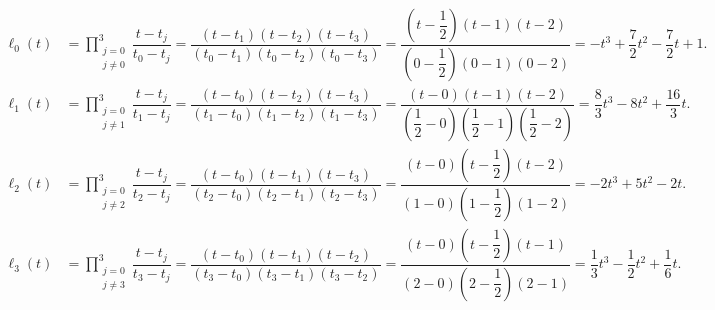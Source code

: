 \begin{frame}
\begin{solution}
		\begin{align*}
			\ell_{0}\left(t\right) & =
			\prod\limits_{\substack{j=0               \\j\neq 0}}^{3}
			\dfrac{t-t_{j}}{t_{0}-t_{j}}=
			\dfrac{
				\left(t-t_{1}\right)
				\left(t-t_{2}\right)
				\left(t-t_{3}\right)
			}{
				\left(t_{0}-t_{1}\right)
				\left(t_{0}-t_{2}\right)
				\left(t_{0}-t_{3}\right)
			}=
			\dfrac{
				\left(t-\dfrac{1}{2}\right)
				\left(t-1\right)\left(t-2\right)
			}{
				\left(0-\dfrac{1}{2}\right)
				\left(0-1\right)
				\left(0-2\right)
			}=
			-t^{3}+\dfrac{7}{2}t^{2}-\dfrac{7}{2}t+1. \\
			\ell_{1}\left(t\right) & =
			\prod\limits_{\substack{j=0               \\j\neq 1}}^{3}
			\dfrac{t-t_{j}}{t_{1}-t_{j}}=
			\dfrac{
				\left(t-t_{0}\right)
				\left(t-t_{2}\right)
				\left(t-t_{3}\right)
			}{
				\left(t_{1}-t_{0}\right)
				\left(t_{1}-t_{2}\right)
				\left(t_{1}-t_{3}\right)
			}=
			\dfrac{
				\left(t-0\right)
				\left(t-1\right)
				\left(t-2\right)
			}{
				\left(\dfrac{1}{2}-0\right)
				\left(\dfrac{1}{2}-1\right)
				\left(\dfrac{1}{2}-2\right)
			}=
			\dfrac{8}{3}t^{3}-8t^{2}+\dfrac{16}{3}t.  \\
			\ell_{2}\left(t\right) & =
			\prod\limits_{\substack{j=0               \\j\neq 2}}^{3}
			\dfrac{t-t_{j}}{t_{2}-t_{j}}=
			\dfrac{
				\left(t-t_{0}\right)
				\left(t-t_{1}\right)
				\left(t-t_{3}\right)
			}{
				\left(t_{2}-t_{0}\right)
				\left(t_{2}-t_{1}\right)
				\left(t_{2}-t_{3}\right)
			}=
			\dfrac{
				\left(t-0\right)
				\left(t-\dfrac{1}{2}\right)
				\left(t-2\right)
			}{
				\left(1-0\right)
				\left(1-\dfrac{1}{2}\right)
				\left(1-2\right)
			}=
			-2t^{3}+5t^{2}-2t.                        \\
			\ell_{3}\left(t\right) & =
			\prod\limits_{\substack{j=0               \\j\neq 3}}^{3}
			\dfrac{t-t_{j}}{t_{3}-t_{j}}=
			\dfrac{
				\left(t-t_{0}\right)
				\left(t-t_{1}\right)
				\left(t-t_{2}\right)
			}{
				\left(t_{3}-t_{0}\right)
				\left(t_{3}-t_{1}\right)
				\left(t_{3}-t_{2}\right)
			}=
			\dfrac{
				\left(t-0\right)
				\left(t-\dfrac{1}{2}\right)
				\left(t-1\right)
			}{
				\left(2-0\right)
				\left(2-\dfrac{1}{2}\right)
				\left(2-1\right)
			}=
			\dfrac{1}{3}t^{3}-\dfrac{1}{2}t^{2}+\dfrac{1}{6}t.
		\end{align*}
	\end{solution}
\end{frame}

